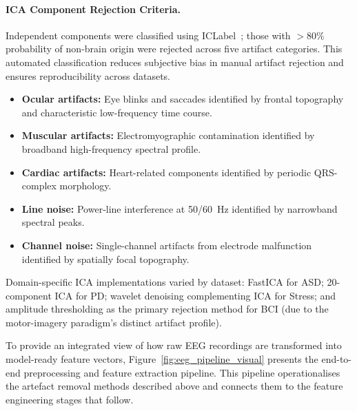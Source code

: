 \paragraph{ICA Component Rejection Criteria.} Independent components were classified using ICLabel~\cite{pion2019iclabel}; those with $>$80\% probability of non-brain origin were rejected across five artifact categories. This automated classification reduces subjective bias in manual artifact rejection and ensures reproducibility across datasets.

\begin{itemize}[leftmargin=*, itemsep=3pt]
  \item \textbf{Ocular artifacts:} Eye blinks and saccades identified by frontal topography and characteristic low-frequency time course.
  \item \textbf{Muscular artifacts:} Electromyographic contamination identified by broadband high-frequency spectral profile.
  \item \textbf{Cardiac artifacts:} Heart-related components identified by periodic QRS-complex morphology.
  \item \textbf{Line noise:} Power-line interference at 50/60~Hz identified by narrowband spectral peaks.
  \item \textbf{Channel noise:} Single-channel artifacts from electrode malfunction identified by spatially focal topography.
\end{itemize}


\noindent Domain-specific ICA implementations varied by dataset: FastICA for ASD; 20-component ICA for PD; wavelet denoising complementing ICA for Stress; and amplitude thresholding as the primary rejection method for BCI (due to the motor-imagery paradigm's distinct artifact profile).


\iffalse

\noindent To provide an integrated view of how raw EEG recordings are transformed into model-ready feature vectors, Figure~\ref{fig:eeg_pipeline_visual} presents the end-to-end preprocessing and feature extraction pipeline. This pipeline operationalises the artefact removal methods described above and connects them to the feature engineering stages that follow.


